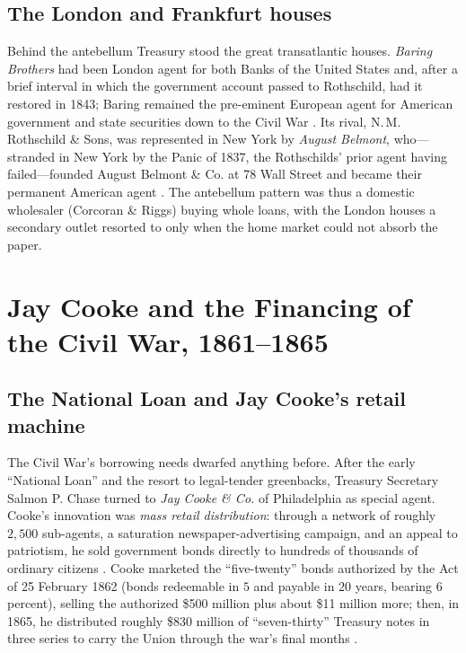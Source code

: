 \documentclass[12pt]{article}
\begin{document}
\subsection{The London and Frankfurt houses}

Behind the antebellum Treasury stood the great transatlantic houses. \emph{Baring
Brothers} had been London agent for both Banks of the United States and, after a
brief interval in which the government account passed to Rothschild, had it
restored in 1843; Baring remained the pre-eminent European agent for American
government and state securities down to the Civil War \citep{hidy1949house}. Its
rival, N.\,M. Rothschild \& Sons, was represented in New York by \emph{August
Belmont}, who---stranded in New York by the Panic of 1837, the Rothschilds' prior
agent having failed---founded August Belmont \& Co. at 78 Wall Street and became
their permanent American agent \citep{ferguson1999house, black1981king,
sexton2005debtor}. The antebellum pattern was thus a domestic wholesaler
(Corcoran \& Riggs) buying whole loans, with the London houses a secondary outlet
resorted to only when the home market could not absorb the paper.

\section{Jay Cooke and the Financing of the Civil War, 1861--1865}

\subsection{The National Loan and Jay Cooke's retail machine}

The Civil War's borrowing needs dwarfed anything before. After the early
``National Loan'' and the resort to legal-tender greenbacks, Treasury Secretary
Salmon P. Chase turned to \emph{Jay Cooke \& Co.} of Philadelphia as special
agent. Cooke's innovation was \emph{mass retail distribution}: through a network
of roughly $2{,}500$ sub-agents, a saturation newspaper-advertising campaign,
and an appeal to patriotism, he sold government bonds directly to hundreds of
thousands of ordinary citizens \citep{larson1936jaycooke, oberholtzer1907jaycooke}.
Cooke marketed the ``five-twenty'' bonds authorized by the Act of 25 February
1862 (bonds redeemable in $5$ and payable in $20$ years, bearing $6$ percent),
selling the authorized \$500 million plus about \$11 million more; then, in
1865, he distributed roughly \$830 million of ``seven-thirty'' Treasury notes
in three series to carry the Union through the war's final months
\citep[128--173]{larson1936jaycooke}.
\end{document}
